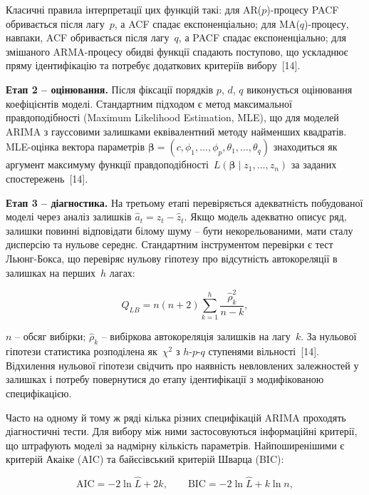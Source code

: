 \documentclass{bachelor_thesis}
\begin{document}
Класичні правила інтерпретації цих функцій такі: для AR($p$)-процесу PACF обривається після лагу~$p$, а ACF спадає експоненціально; для MA($q$)-процесу, навпаки, ACF обривається після лагу~$q$, а PACF спадає експоненціально; для змішаного ARMA-процесу обидві функції спадають поступово, що ускладнює пряму ідентифікацію та потребує додаткових критеріїв вибору~[14].

\textbf{Етап 2 -- оцінювання.} Після фіксації порядків $p$, $d$, $q$ виконується оцінювання коефіцієнтів моделі. Стандартним підходом є метод максимальної правдоподібності (Maximum Likelihood Estimation, MLE), що для моделей ARIMA з гауссовими залишками еквівалентний методу найменших квадратів. MLE-оцінка вектора параметрів $\boldsymbol{\beta} = (c, \phi_1, \ldots, \phi_p, \theta_1, \ldots, \theta_q)$ знаходиться як аргумент максимуму функції правдоподібності~$L(\boldsymbol{\beta} \mid z_1, \ldots, z_n)$ за заданих спостережень~[14].

\textbf{Етап 3 -- діагностика.} На третьому етапі перевіряється адекватність побудованої моделі через аналіз залишків $\hat{a}_t = z_t - \hat{z}_t$. Якщо модель адекватно описує ряд, залишки повинні відповідати білому шуму -- бути некорельованими, мати сталу дисперсію та нульове середнє. Стандартним інструментом перевірки є тест Льюнг-Бокса, що перевіряє нульову гіпотезу про відсутність автокореляції в залишках на перших~$h$ лагах:

\begin{equation}\label{eq:ljung_box}
Q_{LB} = n(n+2) \sum_{k=1}^{h} \frac{\hat{\rho}_k^2}{n-k},
\end{equation}

 $n$ -- обсяг вибірки; $\hat{\rho}_k$ -- вибіркова автокореляція залишків на лагу~$k$. За нульової гіпотези статистика розподілена як~$\chi^2$ з $h $-$ p $-$ q$ ступенями вільності~[14]. Відхилення нульової гіпотези свідчить про наявність невловлених залежностей у залишках і потребу повернутися до етапу ідентифікації з модифікованою специфікацією.

Часто на одному й тому ж ряді кілька різних специфікацій ARIMA проходять діагностичні тести. Для вибору між ними застосовуються інформаційні критерії, що штрафують моделі за надмірну кількість параметрів. Найпоширенішими є критерій Акаіке (AIC) та байєсівський критерій Шварца (BIC):

\begin{equation*}
\text{AIC} = -2 \ln \hat{L} + 2k, \qquad \text{BIC} = -2 \ln \hat{L} + k \ln n,
\end{equation*}
\end{document}
